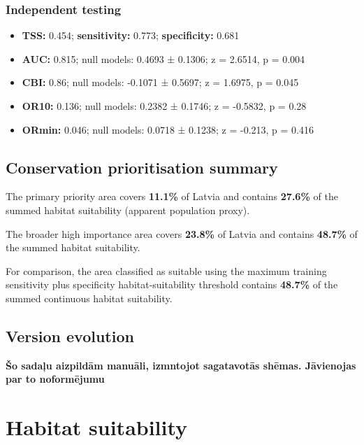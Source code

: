\documentclass[
  openany]{book}
\providecommand{\tightlist}{%
  \setlength{\itemsep}{0pt}\setlength{\parskip}{0pt}}
\providecommand{\tightlist}{%
  \setlength{\itemsep}{0pt}%
  \setlength{\parskip}{0pt}%
}
\begin{document}
\subsubsection*{Independent testing}\label{independent-testing-4}

\begin{itemize}
\tightlist
\item
  \textbf{TSS:} 0.454; \textbf{sensitivity:} 0.773; \textbf{specificity:} 0.681
\item
  \textbf{AUC:} 0.815; null models: 0.4693 ± 0.1306; z = 2.6514, p = 0.004
\item
  \textbf{CBI:} 0.86; null models: -0.1071 ± 0.5697; z = 1.6975, p = 0.045
\item
  \textbf{OR10:} 0.136; null models: 0.2382 ± 0.1746; z = -0.5832, p = 0.28
\item
  \textbf{ORmin:} 0.046; null models: 0.0718 ± 0.1238; z = -0.213, p = 0.416
\end{itemize}

\subsection*{Conservation prioritisation summary}\label{conservation-prioritisation-summary-4}

The primary priority area covers \textbf{11.1\%} of Latvia and contains \textbf{27.6\%} of the summed habitat suitability (apparent population proxy).

The broader high importance area covers \textbf{23.8\%} of Latvia and contains \textbf{48.7\%} of the summed habitat suitability.

For comparison, the area classified as suitable using the maximum training sensitivity plus specificity habitat-suitability threshold contains \textbf{48.7\%} of the summed continuous habitat suitability.

\subsection*{Version evolution}\label{version-evolution-4}

\textbf{Šo sadaļu aizpildām manuāli, izmntojot sagatavotās shēmas. Jāvienojas par to noformējumu}

\section*{Habitat suitability}\label{habitat-suitability-4}
\end{document}
